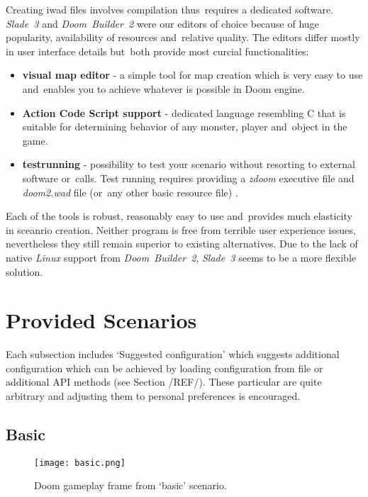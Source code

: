 	Creating iwad files involves compilation thus~requires a dedicated software. \emph{Slade~3} and \emph{Doom~Builder~2}  were our editors of choice because of huge popularity, availability of resources and~relative quality. The editors differ mostly in user interface details but~both provide most curcial functionalities:

	\begin{itemize}
		\item \textbf{visual map editor} - a simple tool for map creation which is very easy to use and~enables you to achieve whatever is possible in Doom engine.
		\item \textbf{Action Code Script support} - dedicated language resembling C that is suitable for determining behavior of any monster, player and~object in the game.
		\item \textbf{testrunning} - possibility to test your scenario without resorting to external software or~calls. Test running requires providing a \emph{zdoom} executive file and \emph{doom2.wad} file (or~any other basic resource file) . 
	\end{itemize}

	Each of the tools is robust, reasonably easy to use and~provides much elasticity in sceanrio creation. Neither program is free from terrible user experience issues, nevertheless they still remain superior to existing alternatives. Due to the lack of native \emph{Linux} support from \emph{Doom~Builder~2}, \emph{Slade~3} seems to be a more flexible solution. 

	\newpage
\section{Provided Scenarios}\label{sec:scenarios}
	Each subsection includes `Suggested configuration' which suggests additional configuration which can be achieved by loading	configuration from file or additional API methods (see Section /REF/). These particular are quite arbitrary and adjusting them to personal preferences is encouraged.

	\subsection{Basic}\label{subsec:basic}
		
		\begin{figure}
			\centering
			\texttt{[image: basic.png]}
			\caption{Doom gameplay frame from `basic' scenario.}\label{fig:basic}
		\end{figure}

